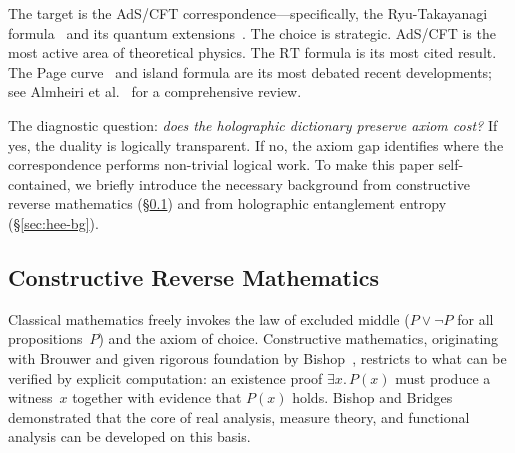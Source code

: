 \documentclass[11pt,a4paper]{article}
\theoremstyle{plain}
\theoremstyle{definition}
\newcommand{\RT}{\ensuremath{\mathrm{RT}}}
\begin{document}
The target is the AdS/CFT correspondence---specifically, the
Ryu-Takayanagi formula~\cite{RT2006} and its quantum
extensions~\cite{FLM2013,EW2015,AEMM2019,Penington2019}.
The choice is strategic.  AdS/CFT is the most active area of
theoretical physics.  The $\RT$ formula is its most cited result.
The Page curve~\cite{Page1993} and island formula are its most
debated recent developments; see
Almheiri et al.~\cite{AHMST2021RMP} for a comprehensive review.

The diagnostic question: \emph{does the holographic dictionary
preserve axiom cost?}  If yes, the duality is logically transparent.
If no, the axiom gap identifies where the correspondence performs
non-trivial logical work.  To make this paper self-contained, we
briefly introduce the necessary background from constructive reverse
mathematics (\S\ref{sec:crm-bg}) and from holographic entanglement
entropy (\S\ref{sec:hee-bg}).

\subsection{Constructive Reverse Mathematics}\label{sec:crm-bg}

Classical mathematics freely invokes the law of excluded middle
($P \lor \lnot P$ for all propositions~$P$) and the axiom of choice.
Constructive mathematics, originating with Brouwer and given
rigorous foundation by Bishop~\cite{Bishop1967}, restricts to
what can be verified by explicit computation: an existence proof
$\exists x.\, P(x)$ must produce a witness~$x$ together with
evidence that $P(x)$ holds.  Bishop and
Bridges~\cite{BB1985} demonstrated that the core of real analysis,
measure theory, and functional analysis can be developed on this
basis.
\end{document}
